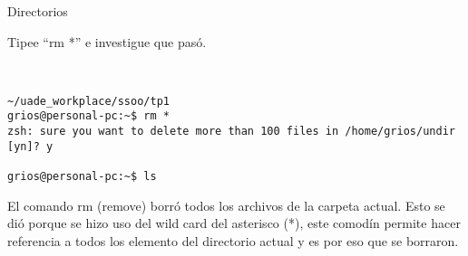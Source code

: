 \begin{section}{Directorios}
\begin{quoting}
Tipee “rm *” e investigue que pasó.
\end{quoting}\\

\begin{lstlisting}[style=Ubuntu]
~/uade_workplace/ssoo/tp1
grios@personal-pc:~$ rm *
zsh: sure you want to delete more than 100 files in /home/grios/undir [yn]? y

grios@personal-pc:~$ ls

\end{lstlisting}

El comando rm (remove) borró todos los archivos de la carpeta actual. Esto se dió porque se hizo uso del wild card del asterisco (*), este comodín permite hacer referencia a todos los elemento del directorio actual y es por eso que se borraron.
\end{section}